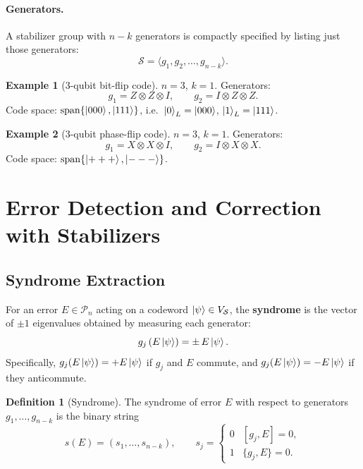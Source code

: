 \documentclass[11pt]{article}
\theoremstyle{definition}
\newtheorem{definition}{Definition}[section]
\newtheorem{example}{Example}[section]
\begin{document}
\paragraph{Generators.}  A stabilizer group with $n-k$ generators is compactly specified by listing just those generators:
\[
    \mathcal{S} = \langle g_1,g_2,\dots,g_{n-k}\rangle.
\]

\begin{example}[3-qubit bit-flip code]
$n=3$, $k=1$.  Generators:
\[
    g_1 = Z\otimes Z\otimes I,\qquad g_2 = I\otimes Z\otimes Z.
\]
Code space: $\operatorname{span}\{\ket{000},\ket{111}\}$, i.e.\ $\ket{0}_L=\ket{000}$, $\ket{1}_L=\ket{111}$.
\end{example}

\begin{example}[3-qubit phase-flip code]
$n=3$, $k=1$.  Generators:
\[
    g_1 = X\otimes X\otimes I,\qquad g_2 = I\otimes X\otimes X.
\]
Code space: $\operatorname{span}\{\ket{+++},\ket{---}\}$.
\end{example}

\section{Error Detection and Correction with Stabilizers}

\subsection{Syndrome Extraction}

For an error $E\in\mathcal{P}_n$ acting on a codeword $\ket{\psi}\in V_{\mathcal{S}}$, the \textbf{syndrome} is the vector of $\pm 1$ eigenvalues obtained by measuring each generator:
\[
    g_j\,(E\ket{\psi}) = \pm\,E\ket{\psi}.
\]
Specifically, $g_j(E\ket{\psi})=+E\ket{\psi}$ if $g_j$ and $E$ commute, and $g_j(E\ket{\psi})=-E\ket{\psi}$ if they anticommute.

\begin{definition}[Syndrome]
The syndrome of error $E$ with respect to generators $g_1,\dots,g_{n-k}$ is the binary string
\[
    s(E) = (s_1,\dots,s_{n-k}),\qquad s_j = \begin{cases}0 & [g_j,E]=0,\\ 1 & \{g_j,E\}=0.\end{cases}
\]
\end{definition}
\end{document}
